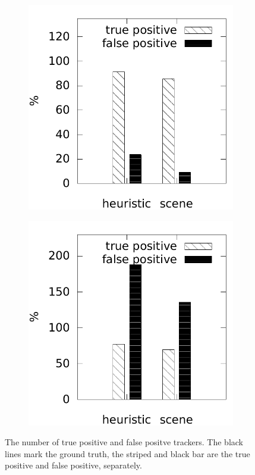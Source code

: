 \begin{figure}
    \centering
     \begin{subfigure}{0.48\linewidth}
    \includegraphics[width=\linewidth]{./img/semantic_tracker/exp/count_lowRes.pdf}
    \end{subfigure}
    \begin{subfigure}{0.48\linewidth}
    \includegraphics[width=\linewidth]{./img/semantic_tracker/exp/count_highRes.pdf}
    \end{subfigure}
    \caption{The number of true positive and false positve trackers. The black lines mark the ground truth, the striped and black bar are the true positive and false positive, separately.}
    \label{fig:semantic-eval-count}
\end{figure}